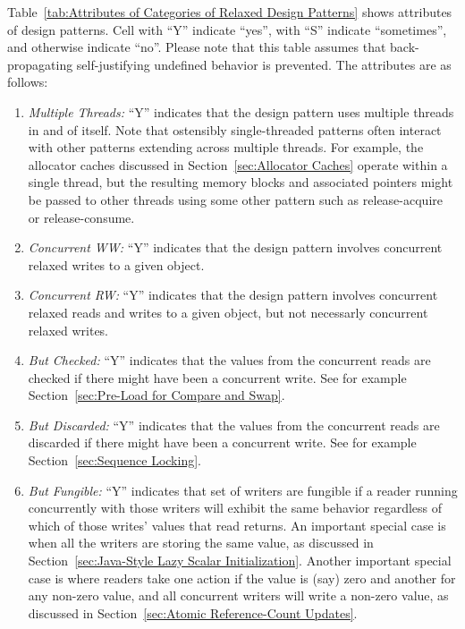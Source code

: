 \documentclass[10]{article}
\begin{document}
Table~\ref{tab:Attributes of Categories of Relaxed Design Patterns}
shows attributes of design patterns.
Cell with ``Y'' indicate ``yes'', with ``S'' indicate ``sometimes'',
and otherwise indicate ``no''.
Please note that this table assumes that back-propagating self-justifying
undefined behavior is prevented.
The attributes are as follows:

\begin{enumerate}
\item	\emph{Multiple Threads:}  ``Y'' indicates that the design pattern
	uses multiple threads in and of itself.
	Note that ostensibly single-threaded patterns often interact
	with other patterns extending across multiple threads.
	For example, the allocator caches discussed in
	Section~\ref{sec:Allocator Caches}
	operate within a single thread, but the resulting memory blocks
	and associated pointers might be passed to other threads using
	some other pattern such as release-acquire or release-consume.
\item	\emph{Concurrent WW:}  ``Y'' indicates that the design pattern
	involves concurrent relaxed writes to a given object.
\item	\emph{Concurrent RW:}  ``Y'' indicates that the design pattern
	involves concurrent relaxed reads and writes to a given object,
	but not necessarly concurrent relaxed writes.
\item	\emph{But Checked:}  ``Y'' indicates that the values from
	the concurrent reads are checked if there might have been a
	concurrent write.  See for example
	Section~\ref{sec:Pre-Load for Compare and Swap}.
\item	\emph{But Discarded:}  ``Y'' indicates that the values from
	the concurrent reads are discarded if there might have been a
	concurrent write.
	See for example Section~\ref{sec:Sequence Locking}.
\item	\emph{But Fungible:}  ``Y'' indicates that set of writers are
	fungible if a reader running concurrently with those writers will
	exhibit the same behavior regardless of which of those writes'
	values that read returns.
	An important special case is when all the writers are storing
	the same value, as discussed in
	Section~\ref{sec:Java-Style Lazy Scalar Initialization}.
	Another important special case is where readers take one
	action if the value is (say) zero and another for any
	non-zero value, and all concurrent writers will write
	a non-zero value, as discussed in
	Section~\ref{sec:Atomic Reference-Count Updates}.


\end{enumerate}
\end{document}
